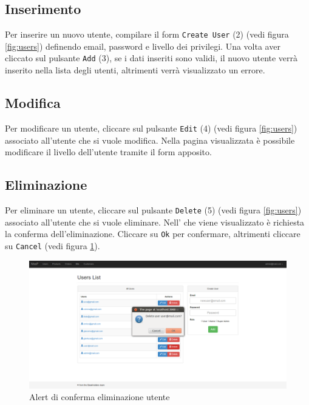 	
	\subsection{Inserimento}
	\label{utenti-inserimento}
	Per inserire un nuovo utente, compilare il form \texttt{Create User} (2) (vedi figura \ref{fig:users}) definendo email, password e livello dei privilegi. Una volta aver cliccato sul pulsante \texttt{Add} (3), se i dati inseriti sono validi, il nuovo utente verrà inserito nella lista degli utenti, altrimenti verrà visualizzato un errore.


	\subsection{Modifica}
	\label{utenti-modifica}
	Per modificare un utente, cliccare sul pulsante \texttt{Edit} (4) (vedi figura \ref{fig:users}) associato all'utente che si vuole modifica. Nella pagina visualizzata è possibile modificare il livello dell'utente tramite il form apposito.


	\subsection{Eliminazione}
	\label{utenti-eliminazione}
	Per eliminare un utente, cliccare sul pulsante \texttt{Delete} (5) (vedi figura \ref{fig:users}) associato all'utente che si vuole eliminare. Nell' che viene visualizzato è richiesta la conferma dell'eliminazione. Cliccare su \texttt{Ok} per confermare, altrimenti cliccare su \texttt{Cancel} (vedi figura \ref{fig:alerteliminazioneutente}).

	\begin{figure}[H]
		\centering \includegraphics[width=1\textwidth]{img/alert-eliminazione-utente.png}
		\caption{ \label{fig:alerteliminazioneutente} Alert di conferma eliminazione utente}
	\end{figure}